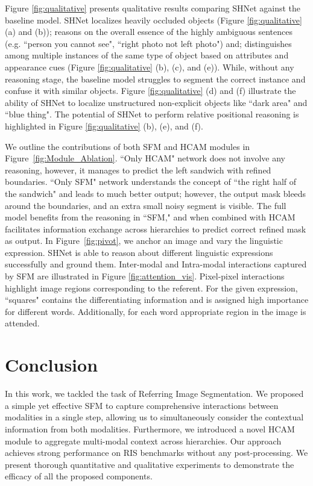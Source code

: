 \documentclass[11pt]{article}
\begin{document}
Figure \ref{fig:qualitative} presents qualitative results comparing SHNet against the baseline model. SHNet localizes heavily occluded objects (Figure \ref{fig:qualitative} (a) and (b)); reasons on the overall essence of the highly ambiguous sentences (e.g. ``person you cannot see", ``right photo not left photo") and; distinguishes among multiple instances of the same type of object based on attributes and appearance cues (Figure \ref{fig:qualitative} (b), (c), and (e)). While, without any reasoning stage, the baseline model struggles to segment the correct instance and confuse it with similar objects. Figure \ref{fig:qualitative} (d) and (f) illustrate the ability of SHNet to localize unstructured non-explicit objects like ``dark area" and ``blue thing". The potential of SHNet to perform relative positional reasoning is highlighted in Figure \ref{fig:qualitative} (b), (e), and (f).









We outline the contributions of both SFM and HCAM modules in Figure~\ref{fig:Module_Ablation}. ``Only HCAM" network does not involve any reasoning, however, it manages to predict the left sandwich with refined boundaries. ``Only SFM" network understands the concept of ``the right half of the sandwich" and leads to much better output; however, the output mask bleeds around the boundaries, and an extra small noisy segment is visible. The full model benefits from the reasoning in ``SFM," and when combined with HCAM facilitates information exchange across hierarchies to predict correct refined mask as output. In Figure~\ref{fig:pivot}, we anchor an image and vary the linguistic expression. SHNet is able to reason about different linguistic expressions successfully and ground them. Inter-modal and Intra-modal interactions captured by SFM are illustrated in Figure \ref{fig:attention_vis}. Pixel-pixel interactions highlight image regions corresponding to the referent. For the given expression, ``squares" contains the differentiating information and is assigned high importance for different words. Additionally, for each word appropriate region in the image is attended.







\section{Conclusion}
In this work, we tackled the task of Referring Image Segmentation. We proposed a simple yet effective SFM to capture comprehensive interactions between modalities in a single step, allowing us to simultaneously consider the contextual information from both modalities. Furthermore, we introduced a novel HCAM module to aggregate multi-modal context across hierarchies. Our approach achieves strong performance on RIS benchmarks without any post-processing. We present thorough quantitative and qualitative experiments to demonstrate the efficacy of all the proposed components.





\end{document}
